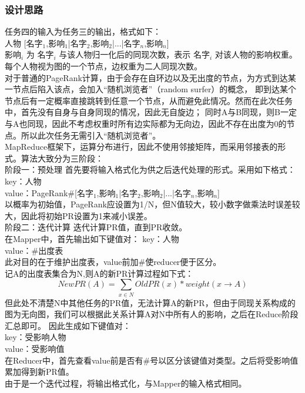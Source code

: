 \documentclass[a4paper,UTF8]{article}
\numberwithin{equation}{section}
\begin{document}
\subsubsection{设计思路}
任务四的输入为任务三的输出，格式如下：\\
人物 [名字$_1$,影响$_1$|名字$_2$,影响$_2$|...|名字$_n$,影响$_n$] \\
影响$_i$ 为 名字$_i$ 与该人物归一化后的同现次数，表示 名字$_i$ 对该人物的影响权重。\\
每个人物视为图的一个节点，边权重为二人同现次数。\\
对于普通的PageRank计算，由于会存在自环边以及无出度的节点，为方式到达某一节点后陷入该点，会加入“随机浏览者”（random surfer）的概念，
即到达某个节点后有一定概率直接跳转到任意一个节点，从而避免此情况。然而在此次任务中，首先没有自身与自身同现的情况，因此无自旋边；
同时A与B同现，则B一定与A也同现，因此不考虑权重时所有边实际都为无向边，因此不存在出度为0的节点。所以此次任务无需引入“随机浏览者”。\\

MapReduce框架下，运算分布进行，因此不使用邻接矩阵，而采用邻接表的形式。算法大致分为三阶段：\\

阶段一：预处理
首先要将输入格式化为供之后迭代处理的形式。采用如下格式：
key：人物\\
value：PageRank\#[名字$_1$,影响$_1$|名字$_2$,影响$_2$|...|名字$_n$,影响$_n$] \\
以概率为初始值，PageRank应设置为1/N，但N值较大，较小数字做乘法时误差较大，因此将初始PR设置为1来减小误差。\\

阶段二：迭代计算
迭代计算PR值，直到PR收敛。\\
在Mapper中，首先输出如下键值对：
key：人物\\
value：\#出度表\\
此对目的在于维护出度表，value前加\#使reducer便于区分。\\
记A的出度表集合为N,则A的新PR计算过程如下式：
$$
NewPR(A)=\sum_{x\in N}OldPR(x)*weight(x\rightarrow A)
$$
但此处不清楚N中其他任务的PR值，无法计算A的新PR，但由于同现关系构成的图为无向图，我们可以根据此关系计算A对N中所有人的影响，之后在Reduce阶段汇总即可。
因此生成如下键值对：\\
key：受影响人物\\
value：受影响值\\
在Reducer中，首先查看value前是否有\#号以区分该键值对类型。之后将受影响值累加得到新PR值。\\
由于是一个迭代过程，将输出格式化，与Mapper的输入格式相同。\\
\end{document}
